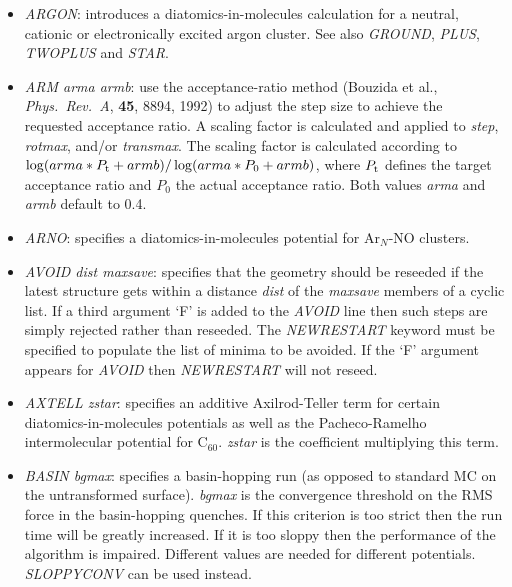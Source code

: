 \documentclass[12pt,a4paper,dvips]{article}
\begin{document}
\begin{itemize}
\item {\it ARGON\/}: introduces a diatomics-in-molecules calculation for
a neutral, cationic or electronically excited argon cluster. See also
{\it GROUND\/}, {\it PLUS\/}, {\it TWOPLUS\/} and {\it STAR\/}.

\item{\it ARM arma armb}: use the acceptance-ratio method (Bouzida et al., {\it Phys.~Rev.~A},
{\bf 45}, 8894, 1992)  to adjust the step size to achieve the requested 
acceptance ratio. A scaling factor is calculated and applied to {\it step}, {\it rotmax},
and/or {\it transmax}. The scaling factor is calculated according to 
$\log(arma*P_{\rm t}+armb)/\log(arma*P_0+armb)$, where $P_{\rm t}$ defines the
target acceptance ratio and $P_0$ the actual acceptance ratio. Both values {\it arma} and
{\it armb} default to 0.4.

\item {\it ARNO\/}: specifies a diatomics-in-molecules potential for Ar$_N$-NO clusters.

\item {\it AVOID dist maxsave}: specifies that the geometry should be reseeded if the
latest structure gets within a distance {\it dist} of the {\it maxsave} members of a
cyclic list. If a third argument `F' is added to the {\it AVOID\/} line then such 
steps are simply rejected rather than reseeded.
The {\it NEWRESTART\/} keyword must be specified to populate the list of
minima to be avoided. If the `F' argument appears for {\it AVOID\/} then
{\it NEWRESTART\/} will not reseed.

\item {\it AXTELL zstar\/}: specifies an additive Axilrod-Teller term for certain
diatomics-in-molecules potentials as well as the Pacheco-Ramelho intermolecular potential for
C$_{60}$.\cite{pachecor97} 
{\it zstar\/} is the coefficient multiplying this term.

\item {\it BASIN bgmax\/}: specifies a basin-hopping run (as opposed to standard MC
on the untransformed surface). {\it bgmax\/} is the convergence threshold
on the RMS force in the basin-hopping
quenches. If this criterion is too strict then the run time will be greatly increased.
If it is too sloppy then the performance of the algorithm is impaired. Different values
are needed for different potentials. {\it SLOPPYCONV} can be used instead.


\end{itemize}
\end{document}
